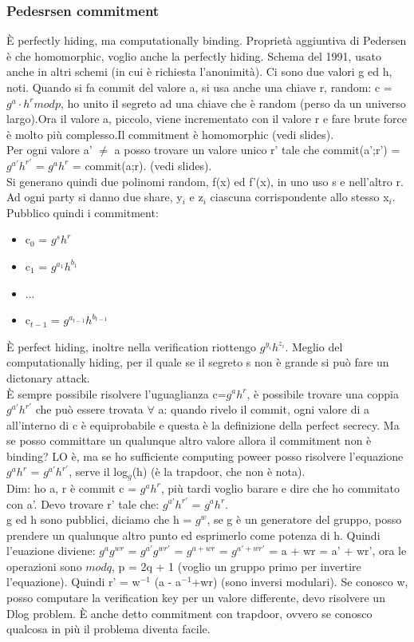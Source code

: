 \documentclass[16px]{article}
\begin{document}
\subsubsection{Pedesrsen commitment}
È perfectly hiding, ma computationally binding. Proprietà aggiuntiva di Pedersen è che homomorphic, voglio anche la perfectly hiding. Schema del 1991, usato anche in altri schemi (in cui è richiesta l'anonimità). Ci sono due valori g ed h, noti. Quando si fa commit del valore a, si usa anche una chiave r, random: c = $g^a \cdot h^r modp$, ho unito il segreto ad una chiave che è random (perso da un universo largo).Ora il valore a, piccolo, viene incrementato con il valore r e fare brute force è molto più complesso.Il commitment è homomorphic (vedi slides).\\ Per ogni valore a' $\neq$ a posso trovare un valore unico r' tale che commit(a';r') = $g^{a'}h^{r'}$ = $g^{a}h^{r}$ = commit(a;r). (vedi slides).\\ Si generano quindi due polinomi random, f(x) ed f'(x), in uno uso s e nell'altro r.\\ Ad ogni party si danno due share, y$_i$ e z$_i$ ciascuna corrispondente allo stesso x$_i$. Pubblico quindi i commitment:
\begin{itemize}
\item c$_0$ = $g^sh^r$
\item c$_1$ = $g^{a_1}h^{b_1}$
\item ...
\item c$_{t-1}$ = $g^{a_{t-1}}h^{b_{t-1}}$
\end{itemize}
È perfect hiding, inoltre nella verification riottengo $g^{y_i}h^{z_i}$. Meglio del computationally hiding, per il quale se il segreto s non è grande si può fare un dictonary attack.\\ È sempre possibile risolvere l'uguaglianza c=$g^ah^r$, è possibile trovare una coppia $g^{a'}h^{r'}$ che può essere trovata $\forall$ a: quando rivelo il commit, ogni valore di a all'interno di c è equiprobabile e questa è la definizione della perfect secrecy. Ma se posso committare un qualunque altro valore allora il commitment non è binding? LO è, ma se ho sufficiente computing poweer posso risolvere l'equazione $g^ah^r$ = $g^{a'}h^{r'}$, serve il log$_g$(h) (è la trapdoor, che non è nota).\\ Dim: ho a, r è commit c = $g^{a}h^{r}$, più tardi voglio barare e dire che ho commitato con a'. Devo trovare r' tale che: $g^{a'}h^{r'}$ = $g^{a}h^{r}$.\\ g ed h sono pubblici, diciamo che h = $g^w$, se g è un generatore del gruppo, posso prendere un qualunque altro punto ed esprimerlo come potenza di h. Quindi l'euazione diviene: $g^{a}g^{wr}$ = $g^{a'}g^{wr'}$ = $g^{a + wr}$ = $g^{a'+ wr'}$ = a + wr = a' + wr', ora le operazioni sono $modq$, p = 2q + 1 (voglio un gruppo primo per invertire l'equazione). Quindi r' = w$^{-1}$ (a - a$^{-1}$+wr) (sono inversi modulari). Se conosco w, posso computare la verification key per un valore differente, devo risolvere un Dlog problem. È anche detto commitment con trapdoor, ovvero se conosco qualcosa in più il problema diventa facile.
\end{document}

